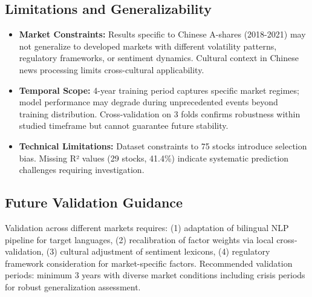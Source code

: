 \documentclass[3p,times,procedia]{elsarticle}
\begin{document}
\subsection{Limitations and Generalizability}
\vspace{-2pt}
\begin{itemize}\setlength{\itemsep}{1pt}
\item \textbf{Market Constraints:} Results specific to Chinese A-shares (2018-2021) may not generalize to developed markets with different volatility patterns, regulatory frameworks, or sentiment dynamics. Cultural context in Chinese news processing limits cross-cultural applicability.

\item \textbf{Temporal Scope:} 4-year training period captures specific market regimes; model performance may degrade during unprecedented events beyond training distribution. Cross-validation on 3 folds confirms robustness within studied timeframe but cannot guarantee future stability.

\item \textbf{Technical Limitations:} Dataset constraints to 75 stocks introduce selection bias. Missing R² values (29 stocks, 41.4\%) indicate systematic prediction challenges requiring investigation.
\end{itemize}

\subsection{Future Validation Guidance}
\vspace{-2pt}
Validation across different markets requires: (1) adaptation of bilingual NLP pipeline for target languages, (2) recalibration of factor weights via local cross-validation, (3) cultural adjustment of sentiment lexicons, (4) regulatory framework consideration for market-specific factors. Recommended validation periods: minimum 3 years with diverse market conditions including crisis periods for robust generalization assessment. 



\end{document}
